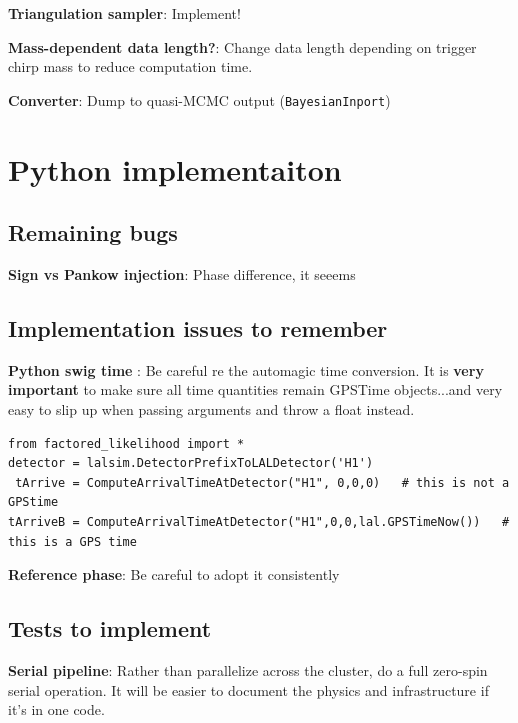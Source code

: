 \documentclass[twocolumn,prd,nofootinbib]{revtex4}
\begin{document}
\noindent \textbf{Triangulation sampler}: Implement!

\noindent \textbf{Mass-dependent data length?}: Change data length depending on trigger chirp mass to reduce computation time.


\noindent \textbf{Converter}: Dump to quasi-MCMC output (\texttt{BayesianInport})

\section{Python implementaiton}



\subsection{Remaining bugs}
\noindent \textbf{Sign vs Pankow injection}: Phase difference, it seeems



\subsection{Implementation issues to remember}



\noindent \textbf{Python swig time }: Be careful re the automagic time conversion. It is \textbf{very important} to make
sure all time quantities remain GPSTime objects...and very easy to slip up when passing arguments and throw a float
instead.  
\begin{shaded}
\begin{verbatim}
from factored_likelihood import *
detector = lalsim.DetectorPrefixToLALDetector('H1')
 tArrive = ComputeArrivalTimeAtDetector("H1", 0,0,0)   # this is not a GPStime
tArriveB = ComputeArrivalTimeAtDetector("H1",0,0,lal.GPSTimeNow())   # this is a GPS time
\end{verbatim}
\end{shaded}

\noindent \textbf{Reference phase}: Be careful to adopt it consistently

\subsection{Tests to implement}
\noindent \textbf{Serial pipeline}: Rather than parallelize across the cluster, do a full zero-spin serial operation.
It will be easier to document the physics and infrastructure if it's in one code.
\end{document}
